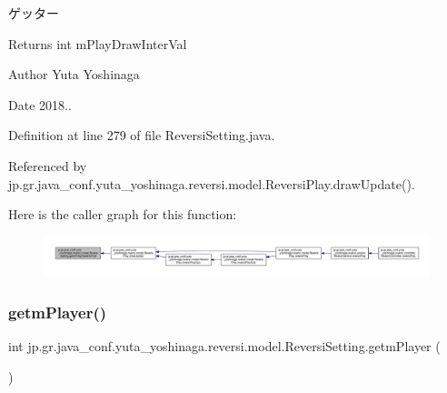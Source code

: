 ゲッター 

\begin{DoxyReturn}{Returns}
int m\+Play\+Draw\+Inter\+Val 
\end{DoxyReturn}
\begin{DoxyAuthor}{Author}
Yuta Yoshinaga 
\end{DoxyAuthor}
\begin{DoxyDate}{Date}
2018.. 
\end{DoxyDate}


Definition at line 279 of file Reversi\+Setting.\+java.



Referenced by jp.\+gr.\+java\+\_\+conf.\+yuta\+\_\+yoshinaga.\+reversi.\+model.\+Reversi\+Play.\+draw\+Update().

Here is the caller graph for this function\+:
\nopagebreak
\begin{figure}[H]
\begin{center}
\leavevmode
\includegraphics[width=350pt]{classjp_1_1gr_1_1java__conf_1_1yuta__yoshinaga_1_1reversi_1_1model_1_1_reversi_setting_a1269bfcbdc192e1f1429407d40cc6e67_icgraph}
\end{center}
\end{figure}
\mbox{\label{classjp_1_1gr_1_1java__conf_1_1yuta__yoshinaga_1_1reversi_1_1model_1_1_reversi_setting_ad6a3e06364081f7f81d88e0f2e35d45c}} 
\subsubsection{\texorpdfstring{getm\+Player()}{getmPlayer()}}
{\footnotesize\ttfamily int jp.\+gr.\+java\+\_\+conf.\+yuta\+\_\+yoshinaga.\+reversi.\+model.\+Reversi\+Setting.\+getm\+Player (\begin{DoxyParamCaption}{ }\end{DoxyParamCaption})}



